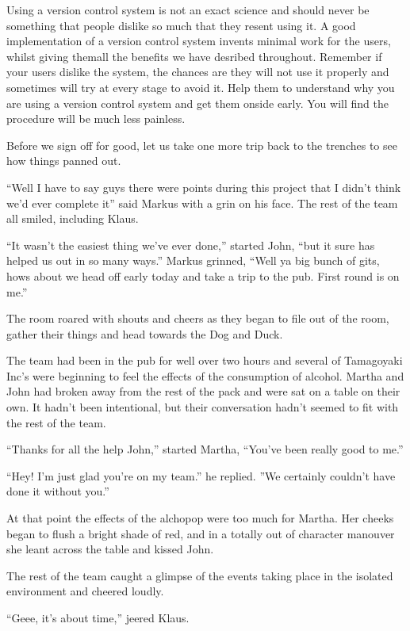 Using a version control system is not an exact science and should never be something that people dislike so much that they resent using it.
A good implementation of a version control system invents minimal work for the users, whilst giving themall the benefits we have desribed throughout.
Remember if your users dislike the system, the chances are they will not use it properly and sometimes will try at every stage to avoid it.
Help them to understand why you are using a version control system and get them onside early.
You will find the procedure will be much less painless.

Before we sign off for good, let us take one more trip back to the trenches to see how things panned out.

\begin{trenches}
``Well I have to say guys there were points during this project that I didn't think we'd ever complete it'' said Markus with a grin on his face.
The rest of the team all smiled, including Klaus.

``It wasn't the easiest thing we've ever done,'' started John, ``but it sure has helped us out in so many ways.''
Markus grinned, ``Well ya big bunch of gits, hows about we head off early today and take a trip to the pub.  First round is on me.''

The room roared with shouts and cheers as they began to file out of the room, gather their things and head towards the Dog and Duck.

\thoughtbreak

The team had been in the pub for well over two hours and several of Tamagoyaki Inc's were beginning to feel the effects of the consumption of alcohol.
Martha and John had broken away from the rest of the pack and were sat on a table on their own.
It hadn't been intentional, but their conversation hadn't seemed to fit with the rest of the team.

``Thanks for all the help John,'' started Martha, ``You've been really good to me.''

``Hey! I'm just glad you're on my team.'' he replied. ''We certainly couldn't have done it without you.''

At that point the effects of the alchopop were too much for Martha.
Her cheeks began to flush a bright shade of red, and in a totally out of character manouver she leant across the table and kissed John.

The rest of the team caught a glimpse of the events taking place in the isolated environment and cheered loudly.

``Geee, it's about time,'' jeered Klaus.
\end{trenches}


